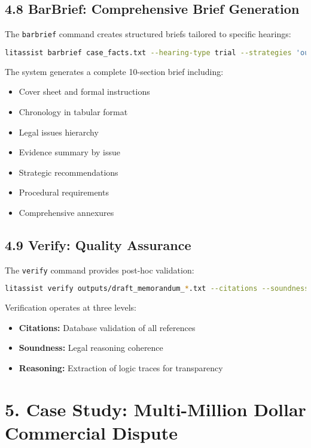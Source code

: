 \documentclass[12pt,a4paper]{article}
\begin{document}
\subsection*{4.8 BarBrief: Comprehensive Brief Generation}

The \texttt{barbrief} command creates structured briefs tailored to specific hearings:

\begin{lstlisting}[language=bash]
litassist barbrief case_facts.txt --hearing-type trial --strategies 'outputs/brainstorm_*.txt' --research 'outputs/lookup_*.txt' --instructions "Focus on limitation period defenses" --verify
\end{lstlisting}

The system generates a complete 10-section brief including:
\begin{itemize}
\item Cover sheet and formal instructions
\item Chronology in tabular format
\item Legal issues hierarchy
\item Evidence summary by issue
\item Strategic recommendations
\item Procedural requirements
\item Comprehensive annexures
\end{itemize}

\subsection*{4.9 Verify: Quality Assurance}

The \texttt{verify} command provides post-hoc validation:

\begin{lstlisting}[language=bash]
litassist verify outputs/draft_memorandum_*.txt --citations --soundness
\end{lstlisting}

Verification operates at three levels:
\begin{itemize}
\item \textbf{Citations:} Database validation of all references
\item \textbf{Soundness:} Legal reasoning coherence
\item \textbf{Reasoning:} Extraction of logic traces for transparency
\end{itemize}

\section*{5. Case Study: Multi-Million Dollar Commercial Dispute}
\end{document}
